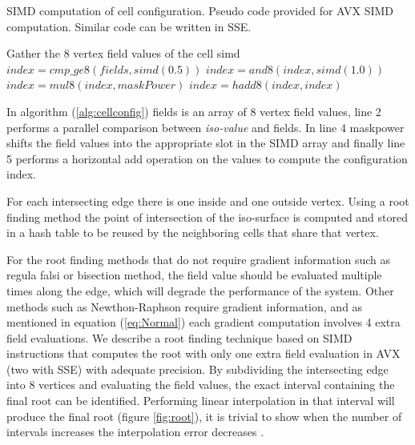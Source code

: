 \begin{algorithm}[H]
\caption{SIMD computation of cell configuration. Pseudo code provided for AVX SIMD computation. Similar code can be written in SSE.}
\label{alg:cellconfig}
\begin{algorithmic}[1]	
  \STATE Gather the 8 vertex field values of the cell  
  \STATE simd $index = cmp\_ge8(fields, simd(0.5))$
  \STATE $index = and8(index, simd(1.0))$
  \STATE $index = mul8(index, maskPower)$  
  \STATE $index = hadd8(index, index)$   
\end{algorithmic}
\end{algorithm}

In algorithm (\ref{alg:cellconfig}) fields is an array of 8 vertex field values, 
line 2 performs a parallel comparison between \textit{iso-value} and fields. 
In line 4 maskpower shifts the field values into the appropriate slot in the SIMD array and finally line 5
performs a horizontal add operation on the values to compute the configuration index.

For each intersecting edge there is one inside and one outside vertex.
Using a root finding method the point of intersection of the iso-surface is computed and stored in a 
hash table to be reused by the neighboring cells that share that vertex. 

For the root finding methods that do not require gradient information such as regula falsi or bisection method, 
the field value should be evaluated multiple times along the edge, which will degrade the performance of the system. Other methods 
such as Newthon-Raphson require gradient information, and as mentioned in equation (\ref{eq:Normal})
each gradient computation involves 4 extra field evaluations. We describe a root finding
technique based on SIMD instructions that computes the root with only one extra field evaluation in AVX (two with SSE) 
with adequate precision. By subdividing the intersecting edge into 8 vertices and evaluating the field values, the exact interval 
containing the final root can be identified. Performing linear interpolation in that interval will produce the 
final root (figure \ref{fig:root}), it is trivial to show when the number of intervals increases the interpolation error decreases \cite{Matthews1987}. 

